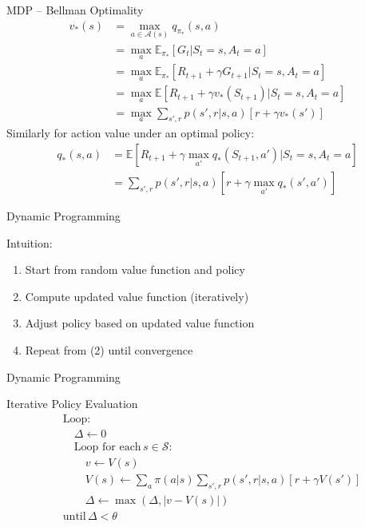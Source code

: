 \documentclass[ignorenonframetext,xcolor=x11names]{beamer}
\begin{document}
\begin{frame}{MDP -- Bellman Optimality}
\begin{align*}
v_*(s) &= \max_{a \in \mathcal{A}(s)} q_{\pi_*} (s, a) \\
&= \max_a \mathbb{E}_{\pi_*} [ G_t | S_t =s , A_t = a ] \\
&= \max_a \mathbb{E}_{\pi_*} [R_{t+1} + \gamma G_{t+1} | S_t =s, A_t =a ] \\
&= \max_a \mathbb{E} [ R_{t+1} + \gamma v_* (S_{t+1}) | S_t =s , A_t =a ] \\
&= \max_a \sum_{s', r} p(s', r | s, a) [ r + \gamma v_* (s')]
\end{align*}
Similarly for action value under an optimal policy:
\begin{align*}
q_*(s, a) &= \mathbb{E} \left[ R_{t+1} + \gamma \max_{a'} q_*(S_{t+1}, a') | S_t = s, A_t =a \right] \\
&= \sum_{s', r} p(s', r | s, a) [ r + \gamma \max_{a'} q_* (s', a') ]
\end{align*}
\end{frame}

\begin{frame}{Dynamic Programming}
\begin{block}{Intuition:}
  \begin{enumerate}
     \item Start from random value function and policy
     \item Compute updated value function (iteratively)
     \item Adjust policy based on updated value function
     \item Repeat from (2) until convergence
  \end{enumerate}
\end{block}
\end{frame}

\begin{frame}{Dynamic Programming}
\begin{block}{Iterative Policy Evaluation}
\begin{align*}
&\text{Loop:} \\
&\quad \Delta \leftarrow 0 \\
&\quad \text{Loop for each}\, s \in \mathcal{S}: \\
&\quad \quad v \leftarrow V(s) \\
&\quad \quad V(s) \leftarrow \sum\nolimits_a \pi(a|s) \sum\nolimits_{s', r} p(s', r|s, a)[r + \gamma V(s')] \\
&\quad \quad \Delta \leftarrow \max (\Delta, |v - V(s)|) \\
&\text{until}\, \Delta < \theta
\end{align*}
\end{block}
\end{frame}
\end{document}
